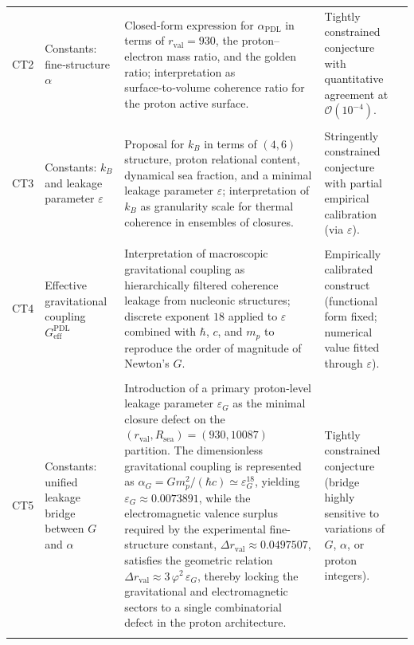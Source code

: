\documentclass[11pt,a4paper]{article}
\newcommand{\PDL}{\mathrm{PDL}}
\begin{document}
\begin{longtable}{L{0.8cm}L{1.9cm}L{5.9cm}L{3cm}L{2.2cm}}
CT2 &
Constants: fine‑structure $\alpha$ &
Closed‑form expression for $\alpha_{\PDL}$ in terms of $r_{\mathrm{val}}=930$, the proton–electron mass ratio, and the golden ratio; interpretation as surface‑to‑volume coherence ratio for the proton active surface. &
Tightly constrained conjecture with quantitative agreement at $\mathcal{O}(10^{-4})$. &
\citep{Alpha_PDL_v2_2026,Born_Golden_v2_2026,PDL_intro,PDL_position} \\\\[0.4em]

CT3 &
Constants: $k_B$ and leakage parameter $\varepsilon$ &
Proposal for $k_B$ in terms of $(4,6)$ structure, proton relational content, dynamical sea fraction, and a minimal leakage parameter $\varepsilon$; interpretation of $k_B$ as granularity scale for thermal coherence in ensembles of closures. &
Stringently constrained conjecture with partial empirical calibration (via $\varepsilon$). &
\citep{PDL_Main_2026,Coherence_Leakage_18_2026,PDL_position} \\\\[0.4em]

CT4 &
Effective gravitational coupling $G_{\mathrm{eff}}^{\PDL}$ &
Interpretation of macroscopic gravitational coupling as hierarchically filtered coherence leakage from nucleonic structures; discrete exponent $18$ applied to $\varepsilon$ combined with $\hbar$, $c$, and $m_p$ to reproduce the order of magnitude of Newton’s $G$. &
Empirically calibrated construct (functional form fixed; numerical value fitted through $\varepsilon$). &
\citep{Exponent_18_PDL_2026,Coherence_Leakage_18_2026,PDL_Main_2026,PDL_position} \\\\[0.4em]

CT5 &
Constants: unified leakage bridge between $G$ and $\alpha$ &
Introduction of a primary proton-level leakage parameter $\varepsilon_G$ as the minimal closure defect on the $(r_{\mathrm{val}},R_{\mathrm{sea}})=(930,10087)$ partition. The dimensionless gravitational coupling is represented as $\alpha_G = G m_p^2 / (\hbar c) \simeq \varepsilon_G^{18}$, yielding $\varepsilon_G \approx 0.0073891$, while the electromagnetic valence surplus required by the experimental fine-structure constant, $\Delta r_{\mathrm{val}} \approx 0.0497507$, satisfies the geometric relation $\Delta r_{\mathrm{val}} \approx 3\,\varphi^2\,\varepsilon_G$, thereby locking the gravitational and electromagnetic sectors to a single combinatorial defect in the proton architecture. &
Tightly constrained conjecture (bridge highly sensitive to variations of $G$, $\alpha$, or proton integers). &
\citep{Exponent_18_PDL_2026,Alpha_PDL_v2_2026,Universal_Coherence_Leakage_2026} \\\\[0.4em]



\end{longtable}
\end{document}
